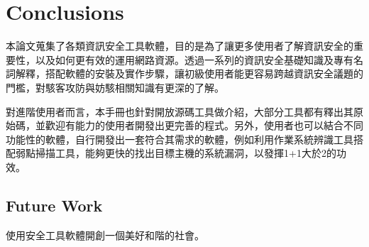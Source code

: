 \chapter{Conclusions}
\label{cha:conclusions}


本論文蒐集了各類資訊安全工具軟體，目的是為了讓更多使用者了解資訊安全的重要性，以及如何更有效的運用網路資源。透過一系列的資訊安全基礎知識及專有名詞解釋，搭配軟體的安裝及實作步驟，讓初級使用者能更容易跨越資訊安全議題的門檻，對駭客攻防與妨駭相關知識有更深的了解。

對進階使用者而言，本手冊也針對開放源碼工具做介紹，大部分工具都有釋出其原始碼，並歡迎有能力的使用者開發出更完善的程式。另外，使用者也可以結合不同功能性的軟體，自行開發出一套符合其需求的軟體，例如利用作業系統辨識工具搭配弱點掃描工具，能夠更快的找出目標主機的系統漏洞，以發揮1+1大於2的功效。

\section{Future Work} 
使用安全工具軟體開創一個美好和階的社會。

